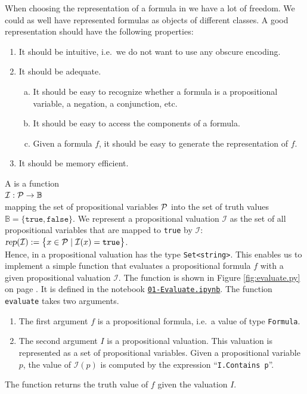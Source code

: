 When choosing the representation of a formula in \Fsharp{} we have a lot of freedom.
We could as well have represented formulas as objects of different classes.  A good representation should have
the following properties:
\begin{enumerate}
\item It should be intuitive, i.e.~we do not want to use any obscure encoding.
\item It should be adequate.
  \begin{enumerate}[(a)]
  \item It should be easy to recognize whether a formula is a propositional variable, a negation, a
        conjunction, etc.
  \item It should be easy to access the components of a formula.
  \item Given a formula $f$, it should be easy to generate the representation of $f$.
  \end{enumerate}
\item It should be memory efficient.
\end{enumerate}

A  is a function  
\\[0.2cm]
\hspace*{1.3cm} ${\cal I}: {\cal P} \rightarrow \mathbb{B}$ \\[0.2cm]
mapping the set of propositional variables ${\cal P}$ into the set of truth values
$\mathbb{B} = \bigl\{ \mathtt{true}, \mathtt{false} \bigr\}$.
We represent a propositional valuation $\mathcal{I}$ as the set of all propositional variables that are mapped
to \texttt{true} by $\mathcal{I}$:
\\[0.2cm]
\hspace*{1.3cm}
$\textsl{rep}(\mathcal{I}) := \bigl\{ x \in \mathcal{P} \mid \mathcal{I}(x) = \texttt{true} \bigr\}$.
\\[0.2cm]
Hence, in \Fsharp{} a propositional valuation has the type \texttt{Set<string>}.
This enables us to implement a simple function that evaluates a propositional formula $f$ with a given
propositional valuation $\mathcal{I}$.
The \Fsharp{} function  is shown in Figure \ref{fig:evaluate.py} on page
\pageref{fig:evaluate.py}.  It is defined in the notebook
\href{https://github.com/karlstroetmann/Logic/blob/master/F-Sharp/Chapter-4/01-Evaluate.ipynb}{\texttt{01-Evaluate.ipynb}}.
The function \texttt{evaluate} takes two arguments.
\begin{enumerate}
\item The first argument $f$ is a propositional formula, i.e.~a value of type \texttt{Formula}.
\item The second argument $I$ is a propositional valuation.  This valuation is represented as a set of
      propositional variables. Given a propositional variable $p$, the value of $\mathcal{I}(p)$ is computed
      by the expression  ``\texttt{I.Contains p}''.
\end{enumerate}
The function returns the truth value of $f$ given the valuation $I$.


